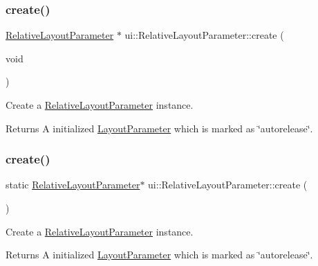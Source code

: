 \subsubsection{\texorpdfstring{create()}{create()}\hspace{0.1cm}{\footnotesize\ttfamily [1/2]}}
{\footnotesize\ttfamily \hyperlink{classui_1_1RelativeLayoutParameter}{Relative\+Layout\+Parameter} $\ast$ ui\+::\+Relative\+Layout\+Parameter\+::create (\begin{DoxyParamCaption}\item[{void}]{ }\end{DoxyParamCaption})\hspace{0.3cm}{\ttfamily [static]}}

Create a \hyperlink{classui_1_1RelativeLayoutParameter}{Relative\+Layout\+Parameter} instance. \begin{DoxyReturn}{Returns}
A initialized \hyperlink{classui_1_1LayoutParameter}{Layout\+Parameter} which is marked as \char`\"{}autorelease\char`\"{}. 
\end{DoxyReturn}
\mbox{\label{classui_1_1RelativeLayoutParameter_ae9b1b854947632ce43085f68451c793a}} 
\subsubsection{\texorpdfstring{create()}{create()}\hspace{0.1cm}{\footnotesize\ttfamily [2/2]}}
{\footnotesize\ttfamily static \hyperlink{classui_1_1RelativeLayoutParameter}{Relative\+Layout\+Parameter}$\ast$ ui\+::\+Relative\+Layout\+Parameter\+::create (\begin{DoxyParamCaption}{ }\end{DoxyParamCaption})\hspace{0.3cm}{\ttfamily [static]}}

Create a \hyperlink{classui_1_1RelativeLayoutParameter}{Relative\+Layout\+Parameter} instance. \begin{DoxyReturn}{Returns}
A initialized \hyperlink{classui_1_1LayoutParameter}{Layout\+Parameter} which is marked as \char`\"{}autorelease\char`\"{}. 
\end{DoxyReturn}
\mbox{\label{classui_1_1RelativeLayoutParameter_ac9b09ffad77d413122c56c06c230c4c7}} 

